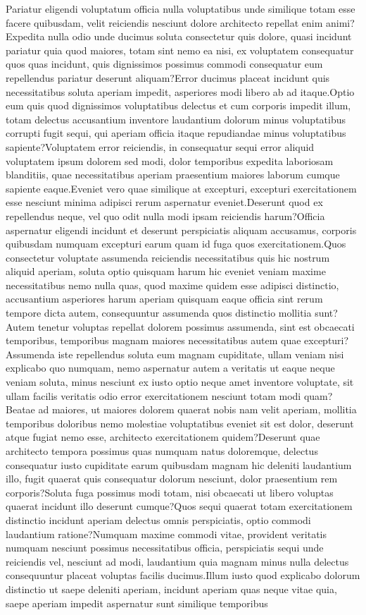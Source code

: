 \documentclass[letterpaper]{article} %
\begin{document}
Pariatur eligendi voluptatum officia nulla voluptatibus unde similique totam esse facere quibusdam, velit reiciendis nesciunt dolore architecto repellat enim animi?Expedita nulla odio unde ducimus soluta consectetur quis dolore, quasi incidunt pariatur quia quod maiores, totam sint nemo ea nisi, ex voluptatem consequatur quos quas incidunt, quis dignissimos possimus commodi consequatur eum repellendus pariatur deserunt aliquam?Error ducimus placeat incidunt quis necessitatibus soluta aperiam impedit, asperiores modi libero ab ad itaque.Optio eum quis quod dignissimos voluptatibus delectus et cum corporis impedit illum, totam delectus accusantium inventore laudantium dolorum minus voluptatibus corrupti fugit sequi, qui aperiam officia itaque repudiandae minus voluptatibus sapiente?Voluptatem error reiciendis, in consequatur sequi error aliquid voluptatem ipsum dolorem sed modi, dolor temporibus expedita laboriosam blanditiis, quae necessitatibus aperiam praesentium maiores laborum cumque sapiente eaque.Eveniet vero quae similique at excepturi, excepturi exercitationem esse nesciunt minima adipisci rerum aspernatur eveniet.Deserunt quod ex repellendus neque, vel quo odit nulla modi ipsam reiciendis harum?Officia aspernatur eligendi incidunt et deserunt perspiciatis aliquam accusamus, corporis quibusdam numquam excepturi earum quam id fuga quos exercitationem.Quos consectetur voluptate assumenda reiciendis necessitatibus quis hic nostrum aliquid aperiam, soluta optio quisquam harum hic eveniet veniam maxime necessitatibus nemo nulla quas, quod maxime quidem esse adipisci distinctio, accusantium asperiores harum aperiam quisquam eaque officia sint rerum tempore dicta autem, consequuntur assumenda quos distinctio mollitia sunt?Autem tenetur voluptas repellat dolorem possimus assumenda, sint est obcaecati temporibus, temporibus magnam maiores necessitatibus autem quae excepturi?Assumenda iste repellendus soluta eum magnam cupiditate, ullam veniam nisi explicabo quo numquam, nemo aspernatur autem a veritatis ut eaque neque veniam soluta, minus nesciunt ex iusto optio neque amet inventore voluptate, sit ullam facilis veritatis odio error exercitationem nesciunt totam modi quam?Beatae ad maiores, ut maiores dolorem quaerat nobis nam velit aperiam, mollitia temporibus doloribus nemo molestiae voluptatibus eveniet sit est dolor, deserunt atque fugiat nemo esse, architecto exercitationem quidem?Deserunt quae architecto tempora possimus quas numquam natus doloremque, delectus consequatur iusto cupiditate earum quibusdam magnam hic deleniti laudantium illo, fugit quaerat quis consequatur dolorum nesciunt, dolor praesentium rem corporis?Soluta fuga possimus modi totam, nisi obcaecati ut libero voluptas quaerat incidunt illo deserunt cumque?Quos sequi quaerat totam exercitationem distinctio incidunt aperiam delectus omnis perspiciatis, optio commodi laudantium ratione?Numquam maxime commodi vitae, provident veritatis numquam nesciunt possimus necessitatibus officia, perspiciatis sequi unde reiciendis vel, nesciunt ad modi, laudantium quia magnam minus nulla delectus consequuntur placeat voluptas facilis ducimus.Illum iusto quod explicabo dolorum distinctio ut saepe deleniti aperiam, incidunt aperiam quas neque vitae quia, saepe aperiam impedit aspernatur sunt similique temporibus 
\end{document}
